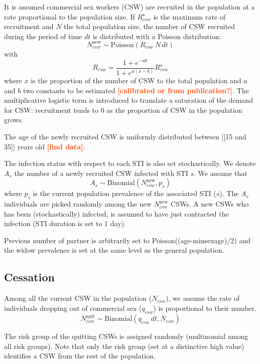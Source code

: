 \documentclass[11pt, onecolumn]{article}
\newcommand{\warning}[1]{\textbf{\textcolor{OrangeRed}{#1}}}
\begin{document}
It is assumed commercial sex workers (CSW) are recruited in the population at a rate proportional to the population size. If $R_{csw}^{\star}$ is the maximum rate of recruitment and $N$ the total population size, the number of CSW recruited during the period of time $dt$ is distributed with a Poisson distribution:
$$N_{csw}^{\mathrm{new}} \sim \text{Poisson}\left(R_{csw}\,N\,dt\right)$$
with 
$$ R_{csw} = \frac{1+e^{-ab}}{1+e^{a(x-b)}}R_{csw}^{\star}$$
where $x$ is the proportion of the number of CSW to the total population and $a$ and $b$ two constants to be estimated \warning{[calibrated or from publication?]}. The multiplicative logistic term is introduced to translate a saturation of the demand for CSW: recruitment tends to 0 as the proportion of CSW in the population grows.

The age of the newly recruited CSW is uniformly distributed between [[15 and 35]] years old \warning{[find data]}.

The infection status with respect to each STI is also set stochastically. We denote $A_s$ the number of a newly recruited CSW infected with STI $s$. We assume that
$$A_s \sim \text{Binomial}(N_{csw}^{\mathrm{new}},p_s)$$
where $p_s$ is the current population prevalence of the associated STI ($s$). The $A_s$ individuals are picked randomly among the new $N_{csw}^{\mathrm{new}}$ CSWs.
A new CSWs who has been (stochastically) infected, is assumed to have just contracted the infection (STI duration is set to 1 day).

Previous number of partner is arbitrarily set to Poisson((age-minsexage)/2) and the widow prevalence is set at the same level as the general population.

\subsection{Cessation}

Among all the current CSW in the population ($N_{csw}$), we assume the rate of individuals dropping out of commercial sex ($q_{csw}$) is proportional to their number.
$$N_{csw}^{\mathrm{quit}} \sim \text{Binomial}\left(q_{csw}\,dt,N_{csw}\right)$$

The risk group of the quitting CSWs is assigned randomly (multinomial among all risk groups). Note that only the risk group (set at a distinctive high value) identifies a CSW from the rest of the population.


\end{document}
